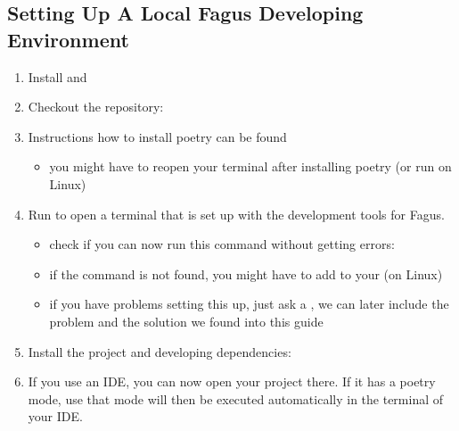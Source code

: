 \documentclass[a4paper,10pt,english]{sphinxmanual}
\begin{document}
\subsection{Setting Up A Local Fagus Developing Environment}
\label{\detokenize{CONTRIBUTING:setting-up-a-local-fagus-developing-environment}}\begin{enumerate}
%
\item {}
\sphinxAtStartPar
Install  and 

\item {}
\sphinxAtStartPar
Checkout the repository: 

\item {}
\sphinxAtStartPar
Instructions how to install poetry can be found 
\begin{itemize}
\item {}
\sphinxAtStartPar
you might have to reopen your terminal after installing poetry (or run  on Linux)

\end{itemize}

\item {}
\sphinxAtStartPar
Run  to open a terminal that is set up with the development tools for Fagus.
\begin{itemize}
\item {}
\sphinxAtStartPar
check if you can now run this command without getting errors: 

\item {}
\sphinxAtStartPar
if the \sphinxhyphen{}command is not found, you might have to add  to your  (on Linux)

\item {}
\sphinxAtStartPar
if you have problems setting this up, just ask a , we can later include the problem and the solution we found into this guide

\end{itemize}

\item {}
\sphinxAtStartPar
Install the project and developing dependencies: 

\item {}
\sphinxAtStartPar
If you use an IDE, you can now open your project there. If it has a poetry mode, use that mode \sphinxhyphen{}  will then be executed automatically in the terminal of your IDE.

\end{enumerate}
\end{document}
